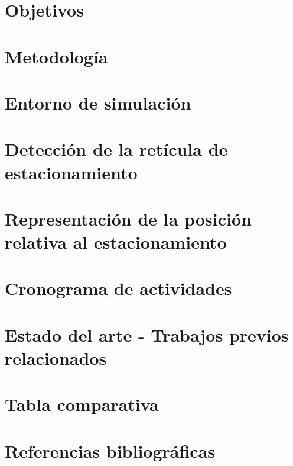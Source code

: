 \documentclass[10pt,letterpaper,final]{article}
\begin{document}
    \section*{Objetivos}
    
    \clearpage

    \section*{Metodología}
    \justify
    



    \section*{Entorno de simulación}
    
    \clearpage

    \section*{Detección de la retícula de estacionamiento}
    
    \clearpage


    \section*{Representación de la posición relativa al estacionamiento}
    
    \clearpage


    \section*{Cronograma de actividades}
    
    \clearpage

    \section*{Estado del arte - Trabajos previos relacionados}
    

    \section*{Tabla comparativa}
    
    \clearpage

    \section*{Referencias bibliográficas}
    
    
\end{document}
